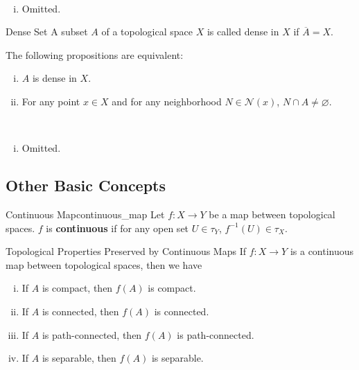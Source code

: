 \documentclass{report}
\begin{document}
\begin{prf}~\\ \vspace{-1em}
	\begin{enumerate}[(i)]
		\item Omitted.
	\end{enumerate}
\end{prf}


\begin{definition}{Dense Set}{}
	A subset $A$ of a topological space $X$ is called dense in $X$ if  $\overline{A}=X$.
\end{definition}

\begin{proposition}{}{}
	The following propositions are equivalent:
	\begin{enumerate}[(i)]
		\item $A$ is dense in $X$.
		\item For any point $x \in X$ and for any neighborhood $N\in\mathcal{N}(x)$, $N\cap A\ne \varnothing$.
	\end{enumerate}
\end{proposition}

\begin{prf}~\\ \vspace{-1em}
	\begin{enumerate}[(i)]
		\item Omitted.
	\end{enumerate}
\end{prf}


\subsection{Other Basic Concepts}

\begin{definition}{Continuous Map}{continuous_map}
	Let $f:X\to Y$ be a map between topological spaces. $f$ is \textbf{continuous} if for any open set $U\in\tau_Y$, $f^{-1}(U)\in\tau_X$.
\end{definition}

\begin{definition}{Topological Properties Preserved by Continuous Maps}{}
	If $f:X\to Y$ is a continuous map between topological spaces, then we have
	\begin{enumerate}[(i)]
		\item If $A$ is compact, then $f(A)$ is compact.
		\item If $A$ is connected, then $f(A)$ is connected.
		\item If $A$ is path-connected, then $f(A)$ is path-connected.
		\item If $A$ is separable, then $f(A)$ is separable.
	\end{enumerate}
\end{definition}
\end{document}

